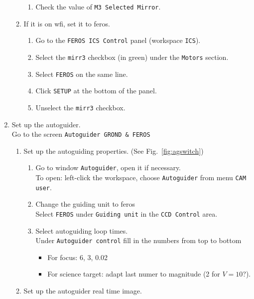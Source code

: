 \documentclass[11pt,fleqn]{book} %
\begin{document}
\begin{enumerate}
\begin{enumerate}
\begin{enumerate}
         \item Check the value of \texttt{M3 Selected Mirror}.
      \end{enumerate}
      \item If it is on \gls{wfi}, set it to \gls{feros}.
      \begin{enumerate}
         \item Go to the \texttt{FEROS ICS Control} panel (workspace \texttt{ICS}).
         \item Select the \texttt{mirr3} checkbox (in green) under the \texttt{Motors} section.
         \item Select \texttt{FEROS} on the same line.
         \item Click \texttt{SETUP} at the bottom of the panel.
         \item Unselect the \texttt{mirr3} checkbox.
      \end{enumerate}  
  \end{enumerate}
  \item Set up the autoguider.\\
  \label{list:autoguiderFeros}
        Go to the screen \texttt{Autoguider GROND \& FEROS}
  \begin{enumerate}
    \item Set up the autoguiding properties. (See Fig.~\ref{fig:agswitch})
    \begin{enumerate}
      \item Go to window \texttt{Autoguider}, open it if necessary.\\
            To open: left-click the workspace, choose \texttt{Autoguider} from menu \texttt{CAM user}.
      \item Change the guiding unit to \gls{feros}\\
            Select \texttt{FEROS} under \texttt{Guiding unit} in the \texttt{CCD Control} area. 
      \item Select autoguiding loop times.\\
            Under \texttt{Autoguider control} fill in the numbers from top to bottom
          \begin{itemize}
             \item For focus: 6, 3, 0.02
             \item For science target: adapt last numer to magnitude (2 for $V=10$?).
          \end{itemize}
    \end{enumerate}
    \item Set up the autoguider real time image.

\end{enumerate}
\end{enumerate}
\end{document}
